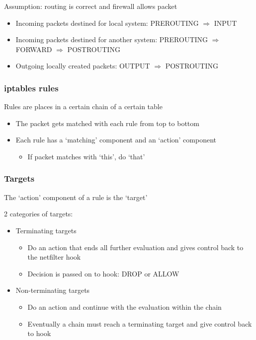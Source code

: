 \documentclass{article}
\begin{document}
Assumption: routing is correct and firewall allows packet

\begin{itemize}
    \item Incoming packets destined for local system: PREROUTING $\Rightarrow$ INPUT
    \item Incoming packets destined for another system: PREROUTING $\Rightarrow$ FORWARD $\Rightarrow$ POSTROUTING
    \item Outgoing locally created packets: OUTPUT $\Rightarrow$ POSTROUTING
\end{itemize}

\subsubsection{iptables rules}

Rules are places in a certain chain of a certain table

\begin{itemize}
    \item The packet gets matched with each rule from top to bottom
    \item Each rule has a `matching' component and an `action' component
    \begin{itemize}
        \item If packet matches with `this', do `that'
    \end{itemize}
\end{itemize}

\subsubsection{Targets}

The `action' component of a rule is the `target'

2 categories of targets:

\begin{itemize}
    \item Terminating targets
    \begin{itemize}
        \item Do an action that ends all further evaluation and gives control back to the netfilter hook
        \item Decision is passed on to hook: DROP or ALLOW
    \end{itemize}
    \item Non-terminating targets
    \begin{itemize}
        \item Do an action and continue with the evaluation within the chain
        \item Eventually a chain must reach a terminating target and give control back to hook
    \end{itemize}
\end{itemize}
\end{document}
